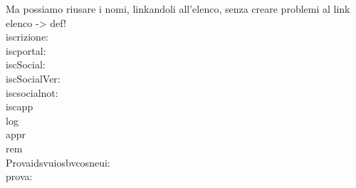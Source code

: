 Ma possiamo riusare i nomi, linkandoli all'elenco, senza creare problemi al link elenco -> def!\\
iscrizione:   \\
iscportal:   \\
iscSocial:   \\
iscSocialVer:   \\
iscsocialnot:   \\
iscapp  \\
log  \\
appr  \\
rem  \\

Provaidsvuiosbvcosneui: \\
prova: 